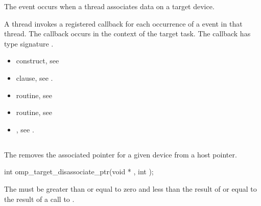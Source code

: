 \begin{ccppspecific}
\events
The  event occurs when a thread associates data on a target device.

\tools

A thread invokes a registered 
callback for each occurrence of a  event in that thread. 
The callback occurs in the context of the target task.  The callback has type signature
. 

\crossreferences
\begin{itemize}
\item {} construct, see 

\item {} clause, see .

\item {} routine, see 

\item {} routine, see 

\item {}, see 
.

\end{itemize}

\pagebreak
{}
\subsection{}
\label{subsec:omp_target_disassociate_ptr}
\summary

The  removes the associated pointer for a
given device from a host pointer.

\format
\begin{boxedcode}
int omp\_target\_disassociate\_ptr(void * , int );
\end{boxedcode}

\constraints


The 
must be greater than or equal to zero and less than the result of
 or equal to the result of a call to
.


\end{ccppspecific}

